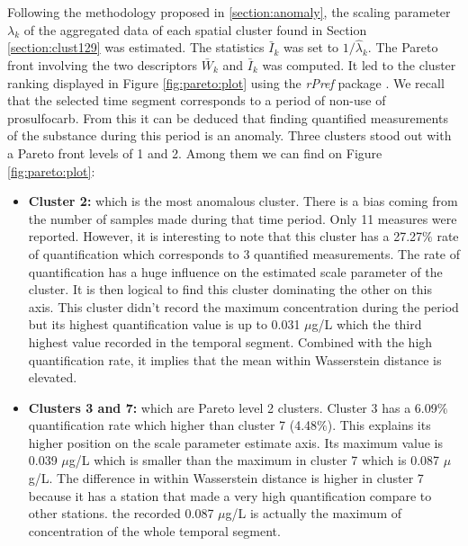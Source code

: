 Following the methodology proposed in \ref{section:anomaly}, the scaling parameter $\lambda_k$ of the aggregated data of each spatial cluster found in Section \ref{section:clust129} was estimated. The statistics $\bar{I}_k$ was set to $1/\hat{\lambda}_k$. The Pareto front involving the two descriptors $\bar{W}_k$ and $\bar{I}_k$ was computed. It led to the cluster ranking displayed in Figure \ref{fig:pareto:plot} using the \emph{rPref} package \cite{RJ-2016-054}. We recall that the selected time segment corresponds to a period of non-use of prosulfocarb. From this it can be deduced that finding quantified measurements of the substance during this period is an anomaly. Three clusters stood out with a Pareto front levels of 1 and 2. Among them we can find on Figure \ref{fig:pareto:plot}: 
\begin{itemize}
    \item \textbf{Cluster 2:} which is the most anomalous cluster. There is a bias coming from the number of samples made during that time period. Only 11 measures were reported. However, it is interesting to note that this cluster has a 27.27$\%$ rate of quantification which corresponds to 3 quantified measurements. The rate of quantification has a huge influence on the estimated scale parameter of the cluster. It is then logical to find this cluster dominating the other on this axis. This cluster didn't record the maximum concentration during the period but its highest quantification value is up to 0.031 $\mu$g/L which the third highest value recorded in the temporal segment. Combined with the high quantification rate, it implies that the mean within Wasserstein distance is elevated.  
    \item \textbf{Clusters 3 and 7:} which are Pareto level 2 clusters. Cluster 3 has a 6.09$\%$ quantification rate which higher than cluster 7 (4.48$\%$). This explains its higher position on the scale parameter estimate axis. Its maximum value is 0.039 $\mu$g/L which is smaller than the maximum in cluster 7 which is 0.087 $\mu$g/L. The difference in within Wasserstein distance is higher in cluster 7 because it has a station that made a very high quantification compare to other stations. the recorded 0.087 $\mu$g/L is actually the maximum of concentration of the whole temporal segment.

\end{itemize}
